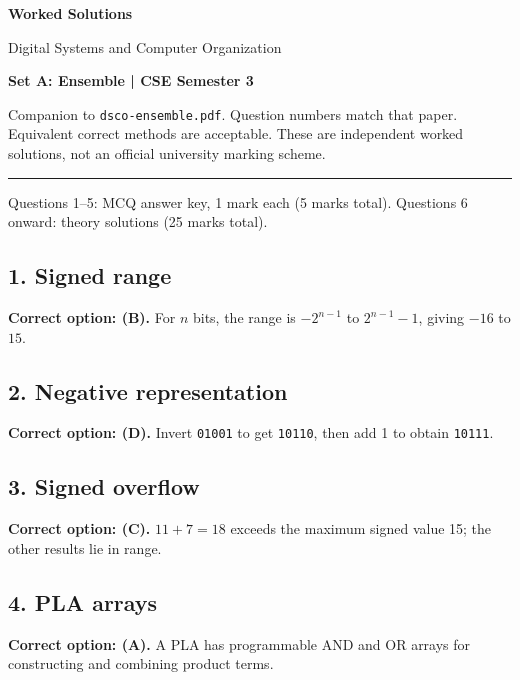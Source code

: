 \documentclass[11pt,a4paper]{article}
\begin{document}
{\LARGE\bfseries Worked Solutions}\par{\large Digital Systems and Computer Organization}\par\textbf{Set A: Ensemble | CSE Semester 3}\par
Companion to \texttt{dsco-ensemble.pdf}. Question numbers match that paper. Equivalent correct methods are acceptable. These are independent worked solutions, not an official university marking scheme.\par\medskip\hrule\medskip
Questions 1--5: MCQ answer key, 1 mark each (5 marks total). Questions 6 onward: theory solutions (25 marks total).\par
\noindent\begin{minipage}{\linewidth}\subsection*{1. Signed range}
\textbf{Correct option: (B).} For $n$ bits, the range is $-2^{n-1}$ to $2^{n-1}-1$, giving $-16$ to $15$.
\end{minipage}\par\medskip
\noindent\begin{minipage}{\linewidth}\subsection*{2. Negative representation}
\textbf{Correct option: (D).} Invert \texttt{01001} to get \texttt{10110}, then add 1 to obtain \texttt{10111}.
\end{minipage}\par\medskip
\noindent\begin{minipage}{\linewidth}\subsection*{3. Signed overflow}
\textbf{Correct option: (C).} $11+7=18$ exceeds the maximum signed value 15; the other results lie in range.
\end{minipage}\par\medskip
\noindent\begin{minipage}{\linewidth}\subsection*{4. PLA arrays}
\textbf{Correct option: (A).} A PLA has programmable AND and OR arrays for constructing and combining product terms.
\end{minipage}\par\medskip
\end{document}
